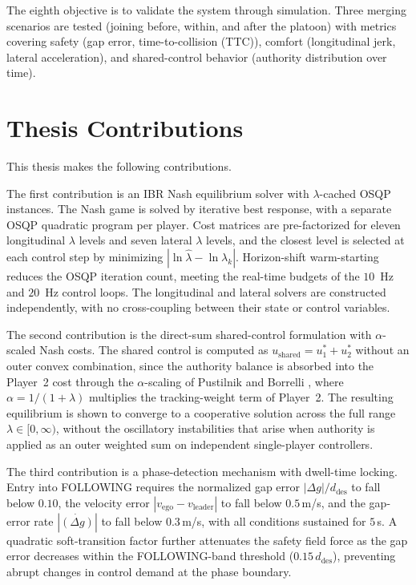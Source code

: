 \documentclass[12pt,a4paper,oneside]{report}
\begin{document}
The eighth objective is to validate the system through simulation. Three merging
scenarios are tested (joining before, within, and after the platoon) with
metrics covering safety (gap error, time-to-collision (TTC)), comfort (longitudinal
jerk, lateral acceleration), and shared-control behavior (authority distribution
over time).

\section{Thesis Contributions}

This thesis makes the following contributions.

The first contribution is an IBR Nash equilibrium solver with $\lambda$-cached OSQP
instances. The Nash game is solved by iterative best response, with a separate OSQP
quadratic program per player. Cost matrices are pre-factorized for eleven
longitudinal $\lambda$ levels and seven lateral $\lambda$ levels, and the closest
level is selected at each control step by minimizing $|\ln\hat{\lambda} - \ln\lambda_k|$. Horizon-shift warm-starting reduces the OSQP iteration count, meeting the real-time budgets of the $10$\, Hz and $20$\, Hz control loops. The longitudinal and lateral solvers are constructed independently, with no cross-coupling between their state or control variables.

The second contribution is the direct-sum shared-control formulation with
$\alpha$-scaled Nash costs. The shared control is computed as $u_{\text{shared}} = u_1^{*} + u_2^{*}$ without an outer convex combination, since the authority balance is absorbed into the Player~2 cost through the $\alpha$-scaling of Pustilnik and Borrelli \cite{pustilnikGeneralizedNashEquilibrium2025}, where $\alpha = 1/(1+\lambda)$ multiplies the tracking-weight term of Player~2. The resulting equilibrium is shown to converge to a cooperative solution across the full range $\lambda \in [0, \infty)$, without the oscillatory instabilities that arise when authority is applied as an outer weighted sum on independent single-player controllers.

The third contribution is a phase-detection mechanism with dwell-time locking. Entry
into FOLLOWING requires the normalized gap error $|\Delta g| / d_{\text{des}}$ to
fall below $0.10$, the velocity error $|v_{\text{ego}} - v_{\text{leader}}|$ to fall
below $0.5$\,m/s, and the gap-error rate $|\dot{(\Delta g)}|$ to fall below
$0.3$\,m/s, with all conditions sustained for $5$\,s. A quadratic soft-transition
factor further attenuates the safety field force as the gap error decreases within
the FOLLOWING-band threshold ($0.15\, d_{\text{des}}$), preventing abrupt changes in
control demand at the phase boundary.
\end{document}
